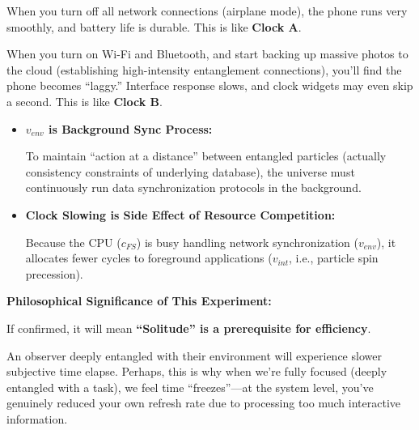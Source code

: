 When you turn off all network connections (airplane mode), the phone runs very smoothly, and battery life is durable. This is like \textbf{Clock A}.

When you turn on Wi-Fi and Bluetooth, and start backing up massive photos to the cloud (establishing high-intensity entanglement connections), you'll find the phone becomes ``laggy.'' Interface response slows, and clock widgets may even skip a second. This is like \textbf{Clock B}.

\begin{itemize}
\item \textbf{$v_{env}$ is Background Sync Process:}

   To maintain ``action at a distance'' between entangled particles (actually consistency constraints of underlying database), the universe must continuously run data synchronization protocols in the background.

\item \textbf{Clock Slowing is Side Effect of Resource Competition:}

   Because the CPU (\textbf{$c_{FS}$}) is busy handling network synchronization (\textbf{$v_{env}$}), it allocates fewer cycles to foreground applications (\textbf{$v_{int}$}, i.e., particle spin precession).
\end{itemize}

\textbf{Philosophical Significance of This Experiment:}

If confirmed, it will mean \textbf{``Solitude'' is a prerequisite for efficiency}.

An observer deeply entangled with their environment will experience slower subjective time elapse. Perhaps, this is why when we're fully focused (deeply entangled with a task), we feel time ``freezes''---at the system level, you've genuinely reduced your own refresh rate due to processing too much interactive information.

